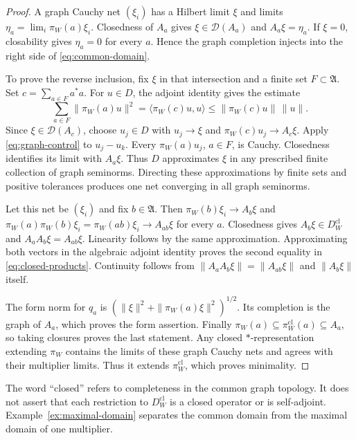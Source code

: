 \begin{proof}
A graph Cauchy net $(\xi_i)$ has a Hilbert limit $\xi$ and limits
$\eta_a=\lim_i\pi_W(a)\xi_i$.  Closedness of $A_a$ gives
$\xi\in\mathcal D(A_a)$ and $A_a\xi=\eta_a$.
If $\xi=0$, closability gives $\eta_a=0$ for every $a$.
Hence the graph completion injects into the right side of
\eqref{eq:common-domain}.

To prove the reverse inclusion, fix $\xi$ in that intersection and a finite
set $F\subset\mathfrak A$.  Set $c=\sum_{a\in F}a^*a$.
For $u\in D$, the adjoint identity gives the estimate
\begin{equation}
 \sum_{a\in F}\|\pi_W(a)u\|^2
 =\langle\pi_W(c)u,u\rangle
 \leq\|\pi_W(c)u\|\,\|u\|.
 \label{eq:graph-control}
\end{equation}
Since $\xi\in\mathcal D(A_c)$, choose $u_j\in D$ with
$u_j\to\xi$ and $\pi_W(c)u_j\to A_c\xi$.
Apply \eqref{eq:graph-control} to $u_j-u_k$.
Every $\pi_W(a)u_j$, $a\in F$, is Cauchy.  Closedness identifies its
limit with $A_a\xi$.  Thus $D$ approximates $\xi$ in any prescribed
finite collection of graph seminorms.
Directing these approximations by finite sets and positive tolerances
produces one net converging in all graph seminorms.

Let this net be $(\xi_i)$ and fix $b\in\mathfrak A$.
Then $\pi_W(b)\xi_i\to A_b\xi$ and
$\pi_W(a)\pi_W(b)\xi_i=\pi_W(ab)\xi_i\to A_{ab}\xi$ for every $a$.
Closedness gives $A_b\xi\in D_W^{\mathrm{cl}}$ and
$A_aA_b\xi=A_{ab}\xi$.
Linearity follows by the same approximation.
Approximating both vectors in the algebraic adjoint identity proves
the second equality in \eqref{eq:closed-products}.
Continuity follows from
$\|A_aA_b\xi\|=\|A_{ab}\xi\|$ and $\|A_b\xi\|$ itself.

The form norm for $q_a$ is
$(\|\xi\|^2+\|\pi_W(a)\xi\|^2)^{1/2}$.
Its completion is the graph of $A_a$, which proves the form assertion.
Finally $\pi_W(a)\subseteq\pi_W^{\mathrm{cl}}(a)\subseteq A_a$,
so taking closures proves the last statement.
Any closed $*$-representation extending $\pi_W$ contains the limits of
these graph Cauchy nets and agrees with their multiplier limits.
Thus it extends $\pi_W^{\mathrm{cl}}$, which proves minimality.
\end{proof}

The word ``closed'' refers to completeness in the common graph topology.
It does not assert that each restriction to
$D_W^{\mathrm{cl}}$ is a closed operator or is self-adjoint.
Example~\ref{ex:maximal-domain} separates the common domain from the
maximal domain of one multiplier.


